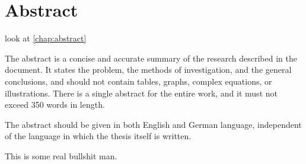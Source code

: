 %
%
%
%

\chapter*{Abstract}
\label{chap:abstract}

look at \ref{chap:abstract}

The abstract is a concise and accurate summary of the research described in the document. It states the problem, the methods of investigation, and the general conclusions, and should not contain tables, graphs, complex equations, or illustrations. There is a single abstract for the entire work, and it must not exceed 350 words in length.

The abstract should be given in both English and German language, independent of the language in which the thesis itself is written.

This is some real bullshit man.

%

